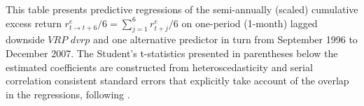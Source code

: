\documentclass[11pt]{article}
\begin{document}
{\begin{sidewaystable}
\begin{center}
{\begin{tabular}{lcccccccccccc}
\end{tabular}
}
\end{center}
\noindent \tiny This table presents predictive regressions of the semi-annually (scaled) cumulative excess return $r^e_{t\rightarrow t+6}/6=\sum^6_{j=1}r^e_{t+j}/6$ on one-period (1-month) lagged downside $VRP$ $dvrp$ and one alternative predictor in turn from September 1996 to December 2007. The Student's t-statistics presented in parentheses below the estimated coefficients are constructed from heteroscedasticity and serial correlation consistent standard errors that explicitly take account of the overlap in the regressions, following \cite{Hodrick92RFS}.
\end{sidewaystable}
}



%
%
\end{document}

